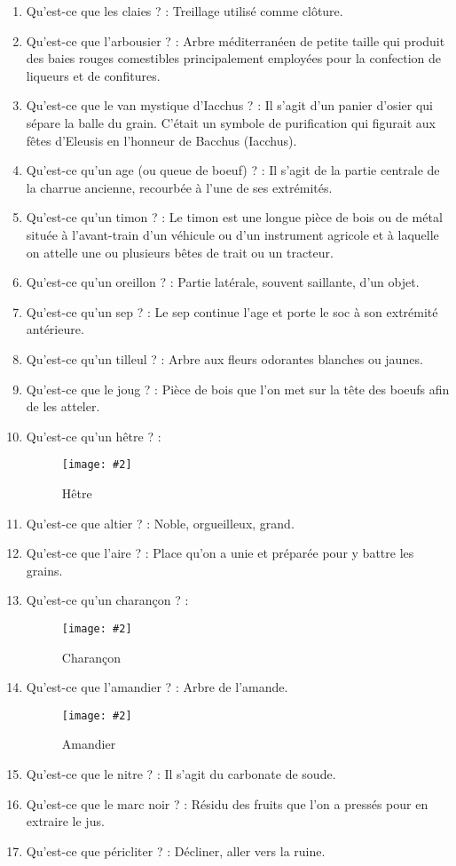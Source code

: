\documentclass[a4paper, 11pt, hidelinks]{article}
\newcommand{\img}[4]{\begin{figure}[!ht]
    \centering
    \texttt{[image: \#2]}
    \caption{#3}
    \label{#4}
    \end{figure} }
\begin{document}
\begin{enumerate}
      \item Qu'est-ce que les claies ? : Treillage utilisé comme clôture.
      \item Qu'est-ce que l'arbousier ? : Arbre méditerranéen de petite taille qui produit des baies rouges comestibles principalement employées pour la confection de liqueurs et de confitures.
      \item Qu'est-ce que le van mystique d'Iacchus ? : Il s'agit d'un panier d'osier qui sépare la balle du grain. C'était un symbole
            de purification qui figurait aux fêtes d'Eleusis en l'honneur de Bacchus (Iacchus).
      \item Qu'est-ce qu'un age (ou queue de boeuf) ? : Il s'agit de la partie centrale de la charrue ancienne, recourbée à l'une de ses extrémités.
      \item Qu'est-ce qu'un timon ? : Le timon est une longue pièce de bois ou de métal située à l'avant-train d'un véhicule ou d'un instrument agricole et à laquelle on attelle une ou plusieurs bêtes de trait ou un tracteur.
      \item Qu'est-ce qu'un oreillon ? : Partie latérale, souvent saillante, d'un objet.
      \item Qu'est-ce qu'un sep ? : Le sep continue l'age et porte le soc à son extrémité antérieure.
      \item Qu'est-ce qu'un tilleul ? : Arbre aux fleurs odorantes blanches ou jaunes.
      \item Qu'est-ce que le joug ? : Pièce de bois que l'on met sur la tête des boeufs afin de les atteler.
      \item Qu'est-ce qu'un hêtre ? : \img{0.5}{Hetre.jpg}{Hêtre}{31}
      \item Qu'est-ce que altier ? : Noble, orgueilleux, grand.
      \item Qu'est-ce que l'aire ? : Place qu’on a unie et préparée pour y battre les grains.
      \item Qu'est-ce qu'un charançon ? : \img{0.5}{Charançon.jpg}{Charançon}{32}
      \item Qu'est-ce que l'amandier ? : Arbre de l'amande. \img{0.5}{Amandier.jpg}{Amandier}{33}
            \newpage
      \item Qu'est-ce que le nitre ? : Il s'agit du carbonate de soude.
      \item Qu'est-ce que le marc noir ? : Résidu des fruits que l'on a pressés pour en extraire le jus.
      \item Qu'est-ce que péricliter ? : Décliner, aller vers la ruine.

\end{enumerate}
\end{document}

